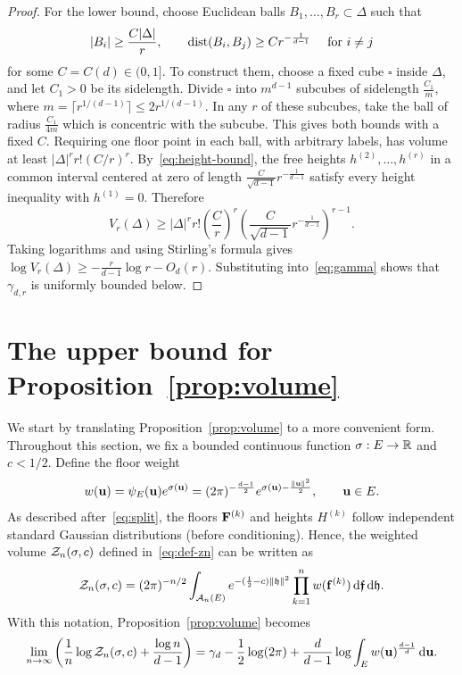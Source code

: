 \documentclass[11pt,letterpaper]{article}
\begin{document}
\begin{proof}
      For the lower bound, choose Euclidean balls $B_1,\ldots,B_r\subset\Delta$ such that
      \[
            |B_i|\ge\frac{C|\Delta|}{r},\qquad \operatorname{dist}(B_i,B_j)\ge C r^{-\frac1{d-1}} \quad\text{ for }i\ne j
      \]
      for some $C=C(d)\in(0,1]$. To construct them, choose a fixed cube $\square$ inside $\Delta$, and let $C_{1}>0$ be its sidelength. Divide $\square$ into $m^{d-1}$ subcubes of sidelength $\frac{C_{1}}{m}$, where $m=\lceil r^{1/(d-1)}\rceil\le2r^{1/(d-1)}$. In any $r$ of these subcubes, take the ball of radius $\frac{C_{1}}{4m}$ which is concentric with the subcube. This gives both bounds with a fixed $C$. Requiring one floor point in each ball, with arbitrary labels, has volume at least $|\Delta|^rr!(C/r)^r$. By~\eqref{eq:height-bound}, the free heights $h^{(2)},\ldots,h^{(r)}$ in a common interval centered at zero of length $\frac C{\sqrt{d-1}}r^{-\frac1{d-1}}$ satisfy every height inequality with $h^{(1)}=0$. Therefore
      \[
            V_r(\Delta) \ge |\Delta|^rr!\left(\frac Cr\right)^r \left(\frac C{\sqrt{d-1}}r^{-\frac1{d-1}}\right)^{r-1}.
      \]
      Taking logarithms and using Stirling's formula gives $\log V_r(\Delta)\ge-\frac r{d-1}\log r-O_d(r)$. Substituting into~\eqref{eq:gamma} shows that $\gamma_{d,r}$ is uniformly bounded below.
\end{proof}

\section{The upper bound for Proposition~\ref{prop:volume}}

\label{sec:upper-bound}
We start by translating Proposition~\ref{prop:volume} to a more convenient form. Throughout this section, we fix a bounded continuous function $\sigma:E\to\mathbb R$ and $c<1/2$. Define the floor weight
\begin{equation}\label{eq:floor_weight_def}
      w(\mathbf u)=\psi_E(\mathbf u)e^{\sigma(\mathbf u)}=(2\pi)^{-\frac{d-1}{2}}e^{\sigma(\mathbf u)-\frac{\|\mathbf u\|^2}{2}},\qquad \mathbf u\in E.
\end{equation}
As described after~\eqref{eq:split}, the floors $\mathbf F^{(k)}$ and heights $H^{(k)}$ follow independent standard Gaussian distributions (before conditioning). Hence, the weighted volume $\mathcal Z_n(\sigma,c)$ defined in~\eqref{eq:def-zn} can be written as
\begin{equation}\label{eq:Z-integral}
      \mathcal Z_n(\sigma,c)=(2\pi)^{-n/2}\int_{\mathcal A_n(E)}
      e^{-(\frac12-c)\|\mathfrak h\|^2}\prod_{k=1}^n w(\mathbf f^{(k)})\,\mathrm d\bm{\mathfrak f}\,\mathrm d\mathfrak h.
\end{equation}
With this notation, Proposition~\ref{prop:volume} becomes
\begin{equation}\label{eq:integral-target}
      \lim_{n\to\infty}\left(\frac1n\log\mathcal Z_n(\sigma,c)+\frac{\log n}{d-1}\right)
      =\gamma_d-\frac12\log(2\pi)
      +\frac d{d-1}\log\int_Ew(\mathbf u)^{\frac{d-1}{d}}\,\mathrm d\mathbf u.
\end{equation}
\end{document}
